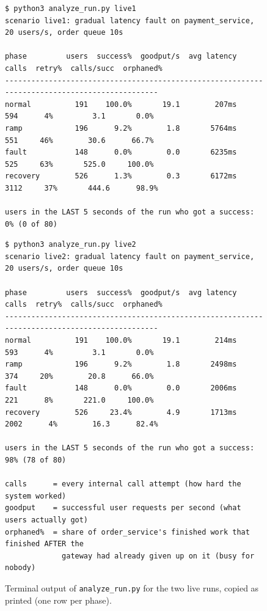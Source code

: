 \documentclass[conference,a4paper]{IEEEtran}
\begin{document}
\begin{figure}[!t]
\centering
\begin{minipage}{0.8\textwidth}
\begin{Verbatim}[fontsize=\scriptsize, frame=single, framesep=1.5mm, label={(a) Run 1: normal retries, no controller}]
$ python3 analyze_run.py live1
scenario live1: gradual latency fault on payment_service, 20 users/s, order queue 10s

phase         users  success%  goodput/s  avg latency    calls  retry%  calls/succ  orphaned%
----------------------------------------------------------------------------------------------
normal          191    100.0%       19.1        207ms      594      4%         3.1       0.0%
ramp            196      9.2%        1.8       5764ms      551     46%        30.6      66.7%
fault           148      0.0%        0.0       6235ms      525     63%       525.0     100.0%
recovery        526      1.3%        0.3       6172ms     3112     37%       444.6      98.9%

users in the LAST 5 seconds of the run who got a success: 0% (0 of 80)
\end{Verbatim}
\vspace{1mm}
\begin{Verbatim}[fontsize=\scriptsize, frame=single, framesep=1.5mm, label={(b) Run 2: same fault, predictive controller running}]
$ python3 analyze_run.py live2
scenario live2: gradual latency fault on payment_service, 20 users/s, order queue 10s

phase         users  success%  goodput/s  avg latency    calls  retry%  calls/succ  orphaned%
----------------------------------------------------------------------------------------------
normal          191    100.0%       19.1        214ms      593      4%         3.1       0.0%
ramp            196      9.2%        1.8       2498ms      374     20%        20.8      66.0%
fault           148      0.0%        0.0       2006ms      221      8%       221.0     100.0%
recovery        526     23.4%        4.9       1713ms     2002      4%        16.3      82.4%

users in the LAST 5 seconds of the run who got a success: 98% (78 of 80)

calls      = every internal call attempt (how hard the system worked)
goodput    = successful user requests per second (what users actually got)
orphaned%  = share of order_service's finished work that finished AFTER the
             gateway had already given up on it (busy for nobody)
\end{Verbatim}
\end{minipage}
\caption{Terminal output of \texttt{analyze\_run.py} for the two live runs, copied as printed (one row per phase).}
\label{fig:live}
\end{figure}
\end{document}
